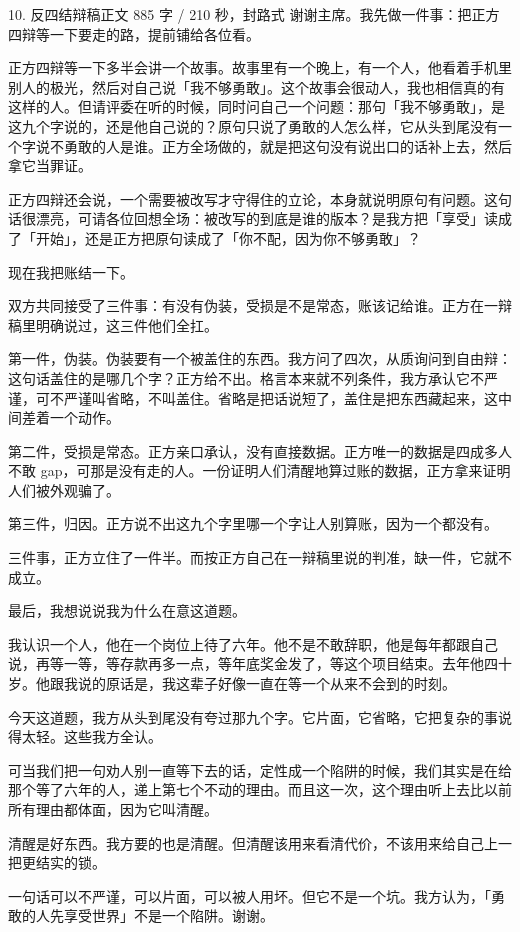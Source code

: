 \documentclass[script,con]{debate}
\begin{document}
\begin{speech}{10. 反四结辩稿}{正文 885 字 / 210 秒，封路式}
谢谢主席。我先做一件事：把正方四辩等一下要走的路，提前铺给各位看。

正方四辩等一下多半会讲一个故事。故事里有一个晚上，有一个人，他看着手机里别人的极光，然后对自己说「我不够勇敢」。这个故事会很动人，我也相信真的有这样的人。但请评委在听的时候，同时问自己一个问题：那句「我不够勇敢」，是这九个字说的，还是他自己说的？原句只说了勇敢的人怎么样，它从头到尾没有一个字说不勇敢的人是谁。正方全场做的，就是把这句没有说出口的话补上去，然后拿它当罪证。

正方四辩还会说，一个需要被改写才守得住的立论，本身就说明原句有问题。这句话很漂亮，可请各位回想全场：被改写的到底是谁的版本？是我方把「享受」读成了「开始」，还是正方把原句读成了「你不配，因为你不够勇敢」？

现在我把账结一下。

双方共同接受了三件事：有没有伪装，受损是不是常态，账该记给谁。正方在一辩稿里明确说过，这三件他们全扛。

第一件，伪装。伪装要有一个被盖住的东西。我方问了四次，从质询问到自由辩：这句话盖住的是哪几个字？正方给不出。格言本来就不列条件，我方承认它不严谨，可不严谨叫省略，不叫盖住。省略是把话说短了，盖住是把东西藏起来，这中间差着一个动作。

第二件，受损是常态。正方亲口承认，没有直接数据。正方唯一的数据是四成多人不敢 gap，可那是没有走的人。一份证明人们清醒地算过账的数据，正方拿来证明人们被外观骗了。

第三件，归因。正方说不出这九个字里哪一个字让人别算账，因为一个都没有。

三件事，正方立住了一件半。而按正方自己在一辩稿里说的判准，缺一件，它就不成立。

最后，我想说说我为什么在意这道题。

我认识一个人，他在一个岗位上待了六年。他不是不敢辞职，他是每年都跟自己说，再等一等，等存款再多一点，等年底奖金发了，等这个项目结束。去年他四十岁。他跟我说的原话是，我这辈子好像一直在等一个从来不会到的时刻。

今天这道题，我方从头到尾没有夸过那九个字。它片面，它省略，它把复杂的事说得太轻。这些我方全认。

可当我们把一句劝人别一直等下去的话，定性成一个陷阱的时候，我们其实是在给那个等了六年的人，递上第七个不动的理由。而且这一次，这个理由听上去比以前所有理由都体面，因为它叫清醒。

清醒是好东西。我方要的也是清醒。但清醒该用来看清代价，不该用来给自己上一把更结实的锁。

一句话可以不严谨，可以片面，可以被人用坏。但它不是一个坑。我方认为，「勇敢的人先享受世界」不是一个陷阱。谢谢。
\end{speech}
\begin{contingency}
\end{contingency}
\end{document}
